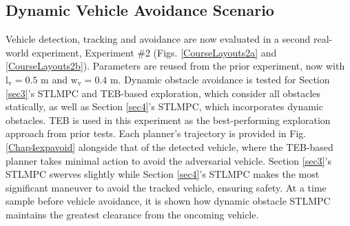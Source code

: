 \documentclass[journal]{IEEEtran}
\begin{document}




\subsection{Dynamic Vehicle Avoidance Scenario}\label{sec:exp2}
Vehicle detection, tracking and avoidance are now evaluated in a second real-world experiment, Experiment \#2 (Figs. \ref{CourseLayouts2a} and \ref{CourseLayouts2b}). Parameters are reused from the prior experiment, now with $\text{l}_\text{v}=0.5$ m and $\text{w}_\text{v}=0.4$ m. Dynamic obstacle avoidance is tested for Section \ref{sec3}'s STLMPC and TEB-based exploration, which consider all obstacles statically, as well as Section \ref{sec4}'s STLMPC, which incorporates dynamic obstacles. TEB is used in this experiment as the best-performing exploration approach from prior tests. Each planner's trajectory is provided in Fig. \ref{Chap4expavoid} alongside that of the detected vehicle, where the TEB-based planner takes minimal action to avoid the adversarial vehicle. Section \ref{sec3}'s STLMPC swerves slightly while Section \ref{sec4}'s STLMPC makes the most significant maneuver to avoid the tracked vehicle, ensuring safety. At a time sample before vehicle avoidance, it is shown how dynamic obstacle STLMPC maintains the greatest clearance from the oncoming vehicle.
\end{document}

